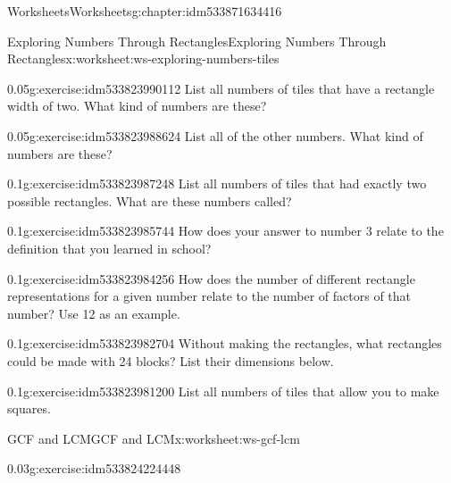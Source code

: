 \documentclass[twoside,11pt,]{book}
\begin{document}
\begin{chapterptx}{Worksheets}{}{Worksheets}{}{}{g:chapter:idm533871634416}
\begin{worksheet-section-numberless}{Exploring Numbers Through Rectangles}{}{Exploring Numbers Through Rectangles}{}{}{x:worksheet:ws-exploring-numbers-tiles}
\begin{introduction}{}
\begin{sidebyside}{1}{0}{0}{0}
\begin{sbspanel}{1}
\end{sbspanel}%
\end{sidebyside}%
\end{introduction}%
\clearpage
\begin{divisionexercise}{1}{}{0.05}{g:exercise:idm533823990112}%
List all numbers of tiles that have a rectangle width of two. What kind of numbers are these?%
\end{divisionexercise}%
\begin{divisionexercise}{2}{}{0.05}{g:exercise:idm533823988624}%
List all of the other numbers. What kind of numbers are these?%
\end{divisionexercise}%
\begin{divisionexercise}{3}{}{0.1}{g:exercise:idm533823987248}%
List all numbers of tiles that had exactly two possible rectangles. What are these numbers called?%
\end{divisionexercise}%
\begin{divisionexercise}{4}{}{0.1}{g:exercise:idm533823985744}%
How does your answer to number 3 relate to the definition that you learned in school?%
\end{divisionexercise}%
\begin{divisionexercise}{5}{}{0.1}{g:exercise:idm533823984256}%
How does the number of different rectangle representations for a given number relate to the number of factors of that number?  Use 12 as an example.%
\end{divisionexercise}%
\begin{divisionexercise}{6}{}{0.1}{g:exercise:idm533823982704}%
Without making the rectangles, what rectangles could be made with 24 blocks? List their dimensions below.%
\end{divisionexercise}%
\begin{divisionexercise}{7}{}{0.1}{g:exercise:idm533823981200}%
List all numbers of tiles that allow you to make squares.%
\end{divisionexercise}%
\end{worksheet-section-numberless}
\restoregeometry
%
%
\typeout{************************************************}
\typeout{************************************************}
%
\begin{worksheet-section-numberless}{GCF and LCM}{}{GCF and LCM}{}{}{x:worksheet:ws-gcf-lcm}
\begin{divisionexercise}{1}{}{0.03}{g:exercise:idm533824224448}%
%
\begin{itemize}[label=\textbullet]

\end{itemize}
\end{divisionexercise}
\end{worksheet-section-numberless}
\end{chapterptx}
\end{document}

